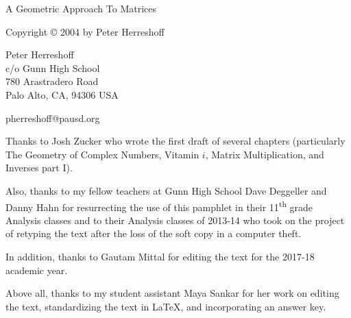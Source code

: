 \documentclass[../gatm.tex]{subfiles}
\begin{document}
\newcommand\dnew{\vspace{1cm}}

\begin{center}
\vspace*{\fill}

\doublespacing
A Geometric Approach To Matrices

Copyright \copyright{} 2004 by Peter Herreshoff

\vspace{1cm}

Peter Herreshoff\\
c/o Gunn High School\\
780 Arastradero Road\\
Palo Alto, CA, 94306 USA

\vspace{.5cm}

pherreshoff@pausd.org

\vspace{1cm}
\end{center}

\noindent Thanks to Josh Zucker who wrote the first draft of several chapters (particularly The Geometry of Complex Numbers, Vitamin $i$, Matrix Multiplication, and Inverses part I).

Also, thanks to my fellow teachers at Gunn High School Dave Deggeller and Danny Hahn for resurrecting the use of this pamphlet in their 11\textsuperscript{th} grade Analysis classes and to their Analysis classes of 2013-14 who took on the project of retyping the text after the loss of the soft copy in a computer theft.

In addition, thanks to Gautam Mittal for editing the text for the 2017-18 academic year.

Above all, thanks to my student assistant Maya Sankar for her work on editing the text, standardizing the text in \LaTeX{}, and incorporating an answer key.

\vspace*{\fill}
\end{document}
